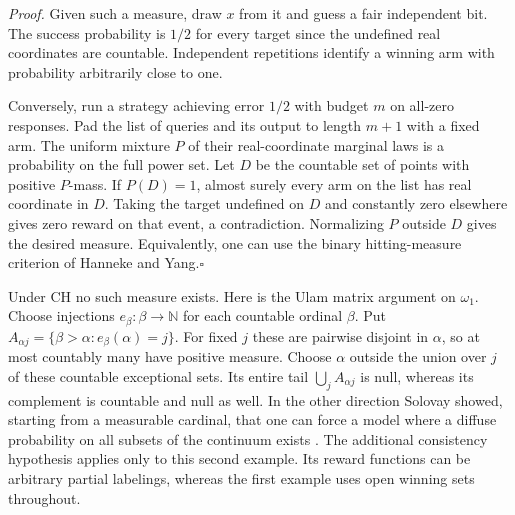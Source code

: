 \documentclass[11pt]{article}
\begin{document}
\emph{Proof.} Given such a measure, draw $x$ from it and guess a fair independent bit. The success probability is $1/2$ for every target since the undefined real coordinates are countable. Independent repetitions identify a winning arm with probability arbitrarily close to one.

Conversely, run a strategy achieving error $1/2$ with budget $m$ on all-zero responses. Pad the list of queries and its output to length $m+1$ with a fixed arm. The uniform mixture $P$ of their real-coordinate marginal laws is a probability on the full power set. Let $D$ be the countable set of points with positive $P$-mass. If $P(D)=1$, almost surely every arm on the list has real coordinate in $D$. Taking the target undefined on $D$ and constantly zero elsewhere gives zero reward on that event, a contradiction. Normalizing $P$ outside $D$ gives the desired measure. Equivalently, one can use the binary hitting-measure criterion of Hanneke and Yang.\hfill$\square$

Under CH no such measure exists. Here is the Ulam matrix argument on $\omega_1$. Choose injections $e_\beta:\beta\to\mathbb N$ for each countable ordinal $\beta$. Put $A_{\alpha j}=\{\beta>\alpha:e_\beta(\alpha)=j\}$. For fixed $j$ these are pairwise disjoint in $\alpha$, so at most countably many have positive measure. Choose $\alpha$ outside the union over $j$ of these countable exceptional sets. Its entire tail $\bigcup_j A_{\alpha j}$ is null, whereas its complement is countable and null as well. In the other direction Solovay showed, starting from a measurable cardinal, that one can force a model where a diffuse probability on all subsets of the continuum exists \cite{sol}. The additional consistency hypothesis applies only to this second example. Its reward functions can be arbitrary partial labelings, whereas the first example uses open winning sets throughout.
\end{document}
